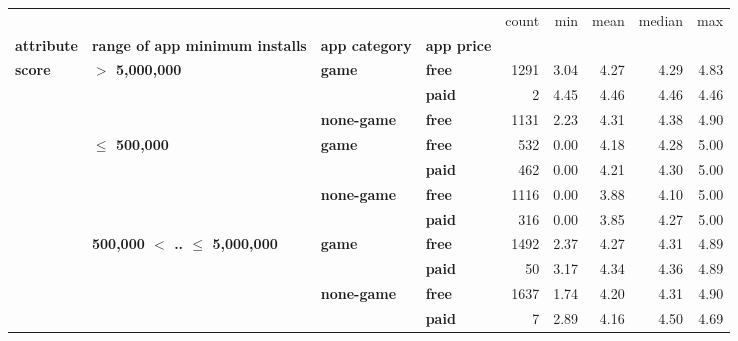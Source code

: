 \begin{tabular}{llll|rrrrr}
\toprule
      &                                 &           &      &  count &        min &       mean &     median &           max \\
\textbf{attribute} & \textbf{range of app minimum installs} & \textbf{app category} & \textbf{app price} &        &            &            &            &               \\
\midrule
\multirow{11}{*}{\textbf{score}} & \multirow{3}{*}{\textbf{$>$ 5,000,000}} & \multirow{2}{*}{\textbf{game}} & \textbf{free} &   1291 &       3.04 &       4.27 &       4.29 &          4.83 \\
      &                                 &           & \textbf{paid} &      2 &       4.45 &       4.46 &       4.46 &          4.46 \\
\cline{3-9}
      &                                 & \textbf{none-game} & \textbf{free} &   1131 &       2.23 &       4.31 &       4.38 &          4.90 \\
\cline{2-9}
      & \multirow{4}{*}{\textbf{$\leq$ 500,000}} & \multirow{2}{*}{\textbf{game}} & \textbf{free} &    532 &       0.00 &       4.18 &       4.28 &          5.00 \\
      &                                 &           & \textbf{paid} &    462 &       0.00 &       4.21 &       4.30 &          5.00 \\
\cline{3-9}
      &                                 & \multirow{2}{*}{\textbf{none-game}} & \textbf{free} &   1116 &       0.00 &       3.88 &       4.10 &          5.00 \\
      &                                 &           & \textbf{paid} &    316 &       0.00 &       3.85 &       4.27 &          5.00 \\
\cline{2-9}
\cline{3-9}
      & \multirow{4}{*}{\textbf{500,000 $<$ .. $\leq$ 5,000,000}} & \multirow{2}{*}{\textbf{game}} & \textbf{free} &   1492 &       2.37 &       4.27 &       4.31 &          4.89 \\
      &                                 &           & \textbf{paid} &     50 &       3.17 &       4.34 &       4.36 &          4.89 \\
\cline{3-9}
      &                                 & \multirow{2}{*}{\textbf{none-game}} & \textbf{free} &   1637 &       1.74 &       4.20 &       4.31 &          4.90 \\
      &                                 &           & \textbf{paid} &      7 &       2.89 &       4.16 &       4.50 &          4.69 \\

\end{tabular}
